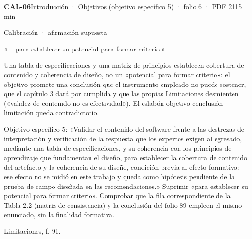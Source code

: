 \noindent\casilla\textbf{CAL-06}\quad{}\quad Introducción · Objetivos (objetivo específico 5) · folio 6 · PDF 21\hfill 15 min\par\vspace{1pt}
{\small\color{gris}Calibración · afirmación supuesta}\par
\begin{dice}«... para establecer su potencial para formar criterio.»\end{dice}
{\small{}Una tabla de especificaciones y una matriz de principios establecen cobertura de contenido y coherencia de diseño, no un «potencial para formar criterio»: el objetivo promete una conclusión que el instrumento empleado no puede sostener, que el capítulo 3 dará por cumplida y que las propias Limitaciones desmienten («validez de contenido no es efectividad»). El eslabón objetivo-conclusión-limitación queda contradictorio.\par}
\begin{debedecir}Objetivo específico 5: «Validar el contenido del software frente a las destrezas de interpretación y verificación de la respuesta que los expertos exigen al egresado, mediante una tabla de especificaciones, y su coherencia con los principios de aprendizaje que fundamentan el diseño, para establecer la cobertura de contenido del artefacto y la coherencia de su diseño, condición previa al efecto formativo: ese efecto no se midió en este trabajo y queda como hipótesis pendiente de la prueba de campo diseñada en las recomendaciones.» Suprimir «para establecer su potencial para formar criterio». Comprobar que la fila correspondiente de la Tabla 2.2 (matriz de consistencia) y la conclusión del folio 89 empleen el mismo enunciado, sin la finalidad formativa.\end{debedecir}
{\small{}Limitaciones, f. 91.\par}
\vspace{6pt}
